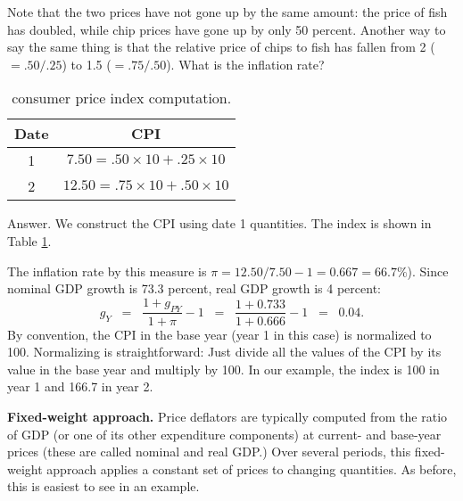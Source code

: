 Note that the two prices have not gone up by the same amount: the
price of fish has doubled, while chip prices have gone up by only 50
percent. Another way to say the same thing is that the relative
price of chips to fish has fallen from 2 ($=.50/.25$) to 1.5
($=.75/.50$). What is the inflation rate?

\begin{table}[!ht]
\centering
\caption{consumer price index 
 computation.}
\begin{tabular*}{0.5\textwidth}{@{\extracolsep{\fill}}cc} %
\toprule
Date  & CPI     \\%
\midrule
1     & $7.50 = .50\times 10+.25\times 10$     \\%
2     & $12.50 = .75\times 10+.50\times 10$    \\%
\bottomrule
\end{tabular*}
\label{tab:cpi}
\end{table}
Answer.  We construct the CPI using date 1 quantities.
The index is shown in Table \ref{tab:cpi}.
%

%
The inflation rate by this measure is $\pi = 12.50/7.50 - 1 = 0.667 = 66.7\%$).
Since nominal GDP growth is 73.3 percent, real GDP growth is 4 percent:
%
$$
    g_{Y} \;\;=\;\;
\frac{1+g_{PY}}{1+\pi}-1 \;\;=\;\;
\frac{1+0.733}{1+0.666}-1 \;\;=\;\; 0.04.
$$
%
By convention, the CPI in the base year (year 1 in this case)
is normalized to 100. Normalizing is straightforward: Just divide
all the values of the CPI by its value in the base year and
multiply by 100. In our example, the index is 100 in year 1 and
166.7 in year 2.

\textbf{Fixed-weight approach. }
Price deflators are typically computed from the ratio of GDP
(or one of its other expenditure components) at current- and base-year prices (these are called
nominal and real GDP.) Over several periods, this
fixed-weight approach  applies a constant set of prices to changing
quantities. As before, this is easiest to see in an example.


